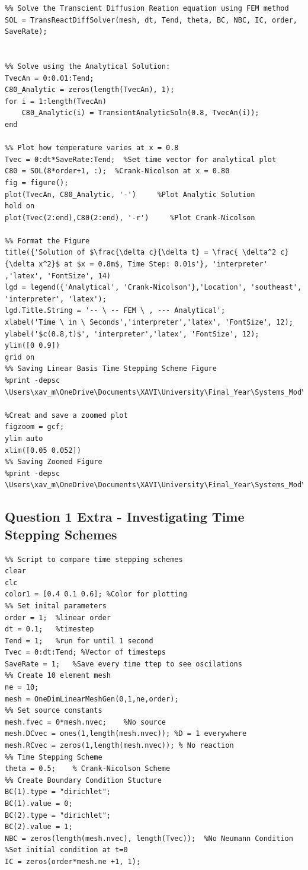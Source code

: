 \documentclass[11pt]{article}
\begin{document}
\begin{appendices}
\begin{lstlisting}
%% Solve the Transcient Diffusion Reation equation using FEM method
SOL = TransReactDiffSolver(mesh, dt, Tend, theta, BC, NBC, IC, order, SaveRate);


%% Solve using the Analytical Solution:
TvecAn = 0:0.01:Tend;
C80_Analytic = zeros(length(TvecAn), 1);
for i = 1:length(TvecAn)
    C80_Analytic(i) = TransientAnalyticSoln(0.8, TvecAn(i));
end

%% Plot how temperature varies at x = 0.8
Tvec = 0:dt*SaveRate:Tend;  %Set time vector for analytical plot
C80 = SOL(8*order+1, :);  %Crank-Nicolson at x = 0.80
fig = figure();
plot(TvecAn, C80_Analytic, '-')     %Plot Analytic Solution
hold on
plot(Tvec(2:end),C80(2:end), '-r')     %Plot Crank-Nicolson

%% Format the Figure
title({'Solution of $\frac{\delta c}{\delta t} = \frac{ \delta^2 c}{\delta x^2}$ at $x = 0.8m$, Time Step: 0.01s'}, 'interpreter' ,'latex', 'FontSize', 14)
lgd = legend({'Analytical', 'Crank-Nicolson'},'Location', 'southeast', 'interpreter', 'latex');
lgd.Title.String = '-- \ -- FEM \ , --- Analytical';
xlabel('Time \ in \ Seconds','interpreter','latex', 'FontSize', 12);
ylabel('$c(0.8,t)$', 'interpreter','latex', 'FontSize', 12);
ylim([0 0.9])
grid on
%% Saving Linear Basis Time Stepping Scheme Figure
%print -depsc \Users\xav_m\OneDrive\Documents\XAVI\University\Final_Year\Systems_Mod\Modeling_CW2\Report\Figures\epsQ1b

%Creat and save a zoomed plot
figzoom = gcf;
ylim auto
xlim([0.05 0.052])
%% Saving Zoomed Figure
%print -depsc \Users\xav_m\OneDrive\Documents\XAVI\University\Final_Year\Systems_Mod\Modeling_CW2\Report\Figures\epsQ1bZoom

\end{lstlisting}

\pagebreak
\subsection{Question 1 Extra - Investigating Time Stepping Schemes}\label{ap:L2}
\begin{lstlisting}
%% Script to compare time stepping schemes
clear
clc
color1 = [0.4 0.1 0.6]; %Color for plotting
%% Set inital parameters
order = 1;  %linear order
dt = 0.1;   %timestep
Tend = 1;   %run for until 1 second
Tvec = 0:dt:Tend; %Vector of timesteps
SaveRate = 1;   %Save every time ttep to see oscilations
%% Create 10 element mesh
ne = 10;
mesh = OneDimLinearMeshGen(0,1,ne,order);
%% Set source constants
mesh.fvec = 0*mesh.nvec;    %No source
mesh.DCvec = ones(1,length(mesh.nvec)); %D = 1 everywhere
mesh.RCvec = zeros(1,length(mesh.nvec)); % No reaction
%% Time Stepping Scheme
theta = 0.5;    % Crank-Nicolson Scheme
%% Create Boundary Condition Stucture
BC(1).type = "dirichlet";   
BC(1).value = 0;
BC(2).type = "dirichlet";
BC(2).value = 1;
NBC = zeros(length(mesh.nvec), length(Tvec));  %No Neumann Condition
%Set initial condition at t=0
IC = zeros(order*mesh.ne +1, 1);


\end{lstlisting}
\end{appendices}
\end{document}
